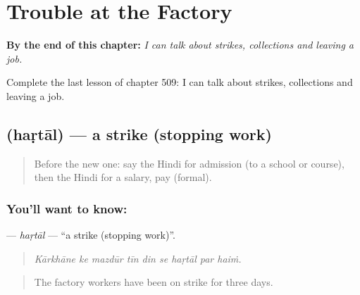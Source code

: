 
\chapter{Trouble at the Factory}
\label{ch:hi-trouble-at-the-factory}

\begin{chapteropening}
\textbf{By the end of this chapter:} \emph{I can talk about strikes, collections and leaving a job.}

Complete the last lesson of chapter 509: I can talk about strikes, collections and leaving a job.
\end{chapteropening}

\section[\texorpdfstring{\hi{हड़ताल} (haṛtāl)}{हड़ताल (haṛtāl)}]{ (haṛtāl) — a strike (stopping work)}

\label{lesson:HI-C509-hartal}



\begin{quote}
Before the new one: say the Hindi for admission (to a school or course), then the Hindi for a salary, pay (formal).
\end{quote}

\subsection*{You'll want to know: }
\textbf{} — \emph{haṛtāl} — \textquotedblleft{}a strike (stopping work)\textquotedblright{}.

\begin{quote}
        
\end{quote}

\begin{quote}
\emph{Kārkhāne ke mazdūr tīn din se haṛtāl par haiṁ.}
\end{quote}

\begin{quote}
The factory workers have been on strike for three days.
\end{quote}


